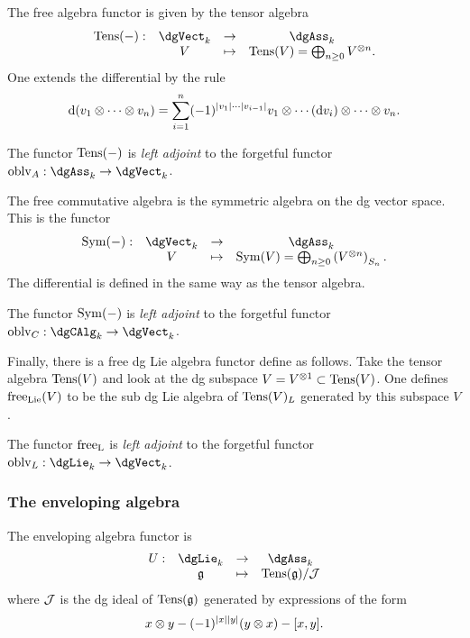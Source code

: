 \documentclass[11pt]{amsart}
\begin{document}
The free algebra functor is given by the tensor algebra 
\[
\begin{array}{cccc}
\Tens(-) : & \dgVect_k & \to & \dgAss_k \\
& V & \mapsto & \Tens(V) = \bigoplus_{n \geq 0} V^{\tensor n} . 
\end{array}
\]
One extends the differential by the rule
\[
{\rm d}(v_1 \otimes \cdots \otimes v_n) = \sum_{i = 1}^n (-1)^{|v_1|\cdots |v_{i-1}|} v_1 \otimes \cdots ({\rm d} v_{i}) \otimes \cdots \otimes v_n .
\]

\begin{fact}
The functor ${\rm Tens}(-)$ is {\em left adjoint} to the forgetful functor $\oblv_A : \dgAss_k \to \dgVect_k$. 
\end{fact}

The free commutative algebra is the symmetric algebra on the dg vector space. 
This is the functor
\[
\begin{array}{cccc}
\Sym(-) : & \dgVect_k & \to & \dgAss_k \\
& V & \mapsto & \Sym (V) = \bigoplus_{n \geq 0} \left(V^{\tensor n}\right)_{S_n} . 
\end{array}
\]
The differential is defined in the same way as the tensor algebra. 

\begin{fact}
The functor ${\rm Sym}(-)$ is {\em left adjoint} to the forgetful functor $\oblv_C : \dgCAlg_k \to \dgVect_k$.
\end{fact}

Finally, there is a free dg Lie algebra functor define as follows. 
Take the tensor algebra ${\rm Tens}(V)$ and look at the dg subspace $V = V^{\otimes 1} \subset {\rm Tens}(V)$. 
One defines ${\rm free}_{\rm Lie}(V)$ to be the sub dg Lie algebra of ${\rm Tens}(V)_L$ generated by this subspace $V$. 

\begin{fact} The functor ${\rm free}_{\rm L}$ is {\em left adjoint} to the forgetful functor $\oblv_L : \dgLie_k \to \dgVect_k$. 
\end{fact}
\subsubsection{The enveloping algebra}

The enveloping algebra functor is
\[
\begin{array}{cccc}
U : & \dgLie_k & \to & \dgAss_k \\
& \fg & \mapsto & \Tens(\fg) / \cJ
\end{array}
\]
where $\mathcal J$ is the dg ideal of ${\rm Tens}(\mathfrak g)$ generated by expressions of the form 
\[
x \otimes y - (-1)^{|x||y|} (y \otimes x) - [x,y].
\]
\end{document}
